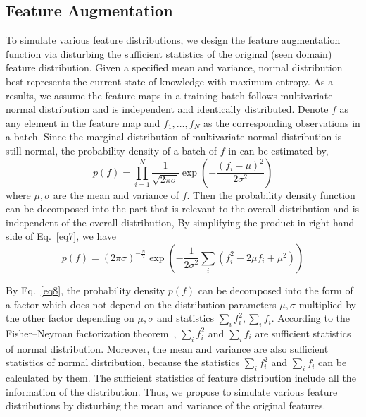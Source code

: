 \documentclass[runningheads]{utils/llncs}
\begin{document}
\subsection{Feature Augmentation}
To simulate various feature distributions, we design the feature augmentation function via disturbing the sufficient statistics of the original (seen domain) feature distribution.
Given a specified mean and variance, normal distribution best represents the current state of knowledge with maximum entropy.
As a results, we assume the feature maps in a training batch follows multivariate normal distribution and is independent and identically distributed.
Denote $f$ as any element in the feature map and ${f}_{1},\dots,{f}_{N}$ as the corresponding observations in a batch.
Since the marginal distribution of multivariate normal distribution is still normal, the probability density of a batch of $f$ in can be estimated by, 
\begin{equation}
\label{eq7}
p(f) = \prod_{i=1}^{N}\frac{1}{\sqrt{2\pi\sigma}}{\exp} \left({-\frac{({f}_{i}-\mu)^2}{2\sigma^2}}\right)
\end{equation}
where $\mu, \sigma$ are the mean and variance of $f$.
Then the probability density function can be decomposed into the part that is relevant to the overall distribution and is independent of the overall distribution,
By simplifying the product in right-hand side of Eq.~\eqref{eq7}, we have
\begin{equation}
\label{eq8}
p(f) 
=(2\pi\sigma)^{-\frac{N}{2}}{\exp} \left({-\frac{1}{2\sigma^2}\sum_{i}{({f}_{i}^2-2\mu{f}_{i}+\mu^2)}}\right)
\end{equation}


By Eq.~\eqref{eq8}, the probability density $p(f)$ can be decomposed into the form of a factor which does not depend on the distribution parameters $\mu, \sigma$ multiplied by the other factor depending on $\mu, \sigma$ and statistics $\sum_{i}{f}_{i}^2, \sum_{i}{f}_{i}$.
According to the Fisher–Neyman factorization theorem~\cite{fisher1922mathematical,splawa1990application}, $\sum_{i}{f}_{i}^2$ and $\sum_{i}{f}_{i}$ are sufficient statistics of normal distribution.
Moreover, the mean and variance are also sufficient statistics of normal distribution, because the statistics $\sum_{i}{f}_{i}^2$ and $\sum_{i}{f}_{i}$ can be calculated by them. 
The sufficient statistics of feature distribution include all the information of the distribution.
Thus, we propose to simulate various feature distributions by disturbing the mean and variance of the original features.
\end{document}
